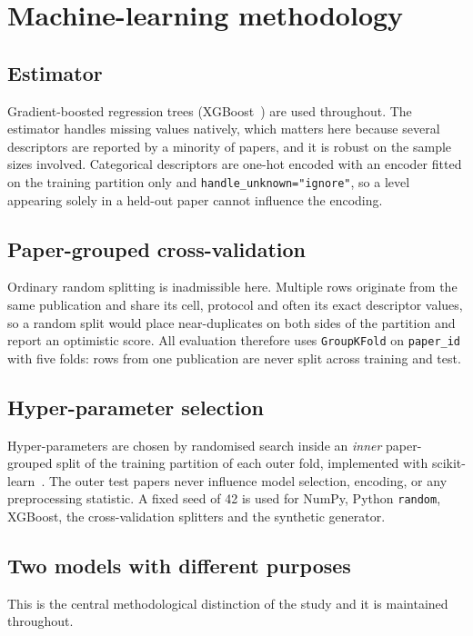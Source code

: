 \section{Machine-learning methodology}\label{sec:methods}

\subsection{Estimator}
Gradient-boosted regression trees (XGBoost~\cite{xgboost2016}) are used throughout. The estimator handles
missing values natively, which matters here because several descriptors are reported by a
minority of papers, and it is robust on the sample sizes involved. Categorical descriptors
are one-hot encoded with an encoder fitted on the training partition only and
\texttt{handle\_unknown="ignore"}, so a level appearing solely in a held-out paper cannot
influence the encoding.

\subsection{Paper-grouped cross-validation}
Ordinary random splitting is inadmissible here. Multiple rows originate from the same
publication and share its cell, protocol and often its exact descriptor values, so a random
split would place near-duplicates on both sides of the partition and report an optimistic
score. All evaluation therefore uses \texttt{GroupKFold} on \texttt{paper\_id} with five
folds: rows from one publication are never split across training and test.

\subsection{Hyper-parameter selection}
Hyper-parameters are chosen by randomised search inside an \emph{inner} paper-grouped
split of the training partition of each outer fold, implemented with
scikit-learn~\cite{sklearn2011}. The outer test papers never influence
model selection, encoding, or any preprocessing statistic. A fixed seed of 42 is used for
NumPy, Python \texttt{random}, XGBoost, the cross-validation splitters and the synthetic
generator.

\subsection{Two models with different purposes}
This is the central methodological distinction of the study and it is maintained throughout.

